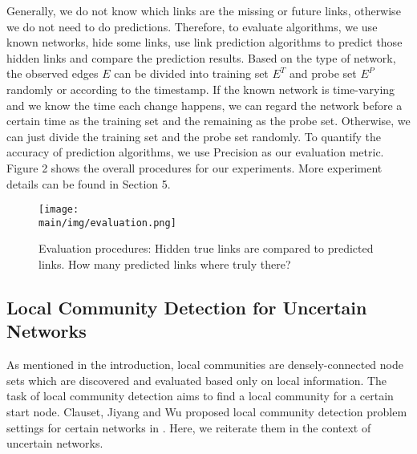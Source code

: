 \documentclass[\main/thesis.tex]{subfiles}
\begin{document}
Generally, we do not know which links are the missing or future links, otherwise we do not need to do predictions. Therefore, to evaluate algorithms, we use known networks, hide some links, use link prediction algorithms to predict those hidden links and compare the prediction results. Based on the type of network, the observed edges $E$ can be divided into training set $E^T$ and probe set $E^P$ randomly or according to the timestamp. If the known network is time-varying and we know the time each change happens, we can regard the network before a certain time as the training set and the remaining as the probe set. Otherwise, we can just divide the training set and the probe set randomly. To quantify the accuracy of prediction algorithms, we use Precision as our evaluation metric. Figure 2 shows the overall procedures for our experiments. More experiment details can be found in Section 5.
\begin{figure}
\centering
\texttt{[image: \\main/img/evaluation.png]}
\caption{Evaluation procedures: Hidden true links are compared to predicted links. How many predicted links where truly there?}
\label{example}
\end{figure}


\subsection{Local Community Detection for Uncertain Networks}
As mentioned in the introduction, local communities are densely-connected node sets which are discovered and evaluated based only on local information. The task of local community detection aims to find a local community for a certain start node. Clauset, Jiyang and Wu proposed local community detection problem settings for certain networks in \cite{clauset2005finding,chen2009detecting,wu2012local}. Here, we reiterate them in the context of uncertain networks.
\end{document}
